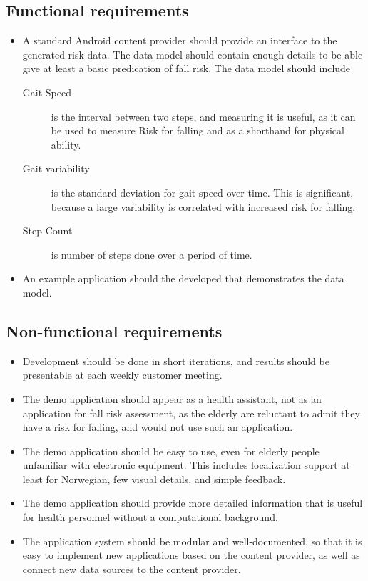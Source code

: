 \subsection{Functional requirements}
\begin{itemize}
\item A standard Android content provider should provide an interface to the generated risk data. The data model should contain enough details to be able give at least a basic predication of fall risk. The data model should include 
\begin{description}
\item[Gait Speed] \label{def:gaitSpeed}is the interval between two steps, and measuring it is useful, as it can be used to measure Risk for falling and as a shorthand for physical ability.
\item[Gait variability] \label{def:gaitVariability}is the standard deviation for gait speed over time. This is significant, because a large variability is correlated with increased risk for falling.
\item[Step Count] \label{def:stepCount}is number of steps done over a period of time. 
\end{description}
\item An example application should the developed that demonstrates the data model.
\end{itemize}	

\subsection{Non-functional requirements}
\begin{itemize}
\item Development should be done in short iterations, and results should be presentable at each weekly customer meeting.
\item The demo application should appear as a health assistant, not as an application for fall risk assessment, as the elderly are reluctant to admit they have a risk for falling, and would not use such an application.
\item The demo application should be easy to use, even for elderly people unfamiliar with electronic equipment. This includes localization support at least for Norwegian, few visual details, and simple feedback.
\item The demo application should provide more detailed information that is useful for health personnel without a computational background.
\item The application system should be modular and well-documented, so that it is easy to implement new applications based on the content provider, as well as connect new data sources to the content provider.
\end{itemize}

